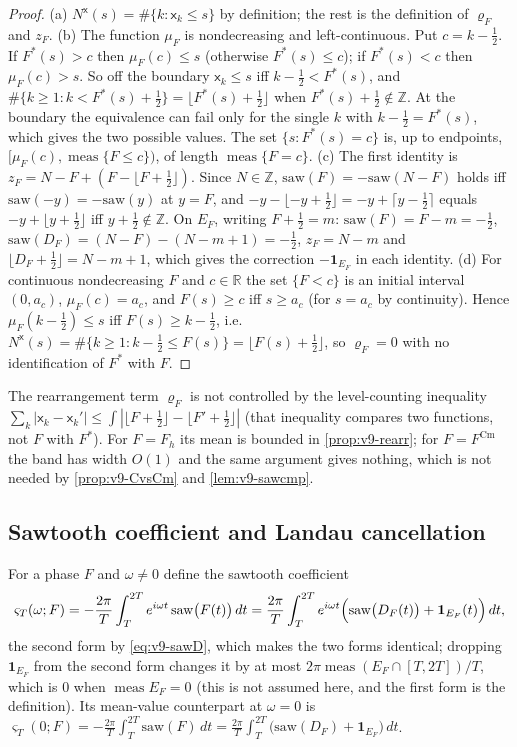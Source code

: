 \documentclass[11pt,a4paper]{article}
\numberwithin{equation}{section}
\theoremstyle{definition}
\theoremstyle{remark}
\newcommand{\meas}{\operatorname{meas}}
\newcommand{\ind}{\mathbf 1}
\newcommand{\Cm}{\mathrm{Cm}}
\begin{document}
\begin{proof}
(a) $N^{\mathsf x}(s)=\#\{k:\mathsf x_k\le s\}$ by definition; the rest is the definition of $\varrho_F$ and $z_F$. (b) The function $\mu_F$ is nondecreasing and left-continuous. Put $c=k-\frac12$. If $F^*(s)>c$ then $\mu_F(c)\le s$ (otherwise $F^*(s)\le c$); if $F^*(s)<c$ then $\mu_F(c)>s$. So off the boundary $\mathsf x_k\le s$ iff $k-\frac12<F^*(s)$, and $\#\{k\ge1:k<F^*(s)+\frac12\}=\lfloor F^*(s)+\frac12\rfloor$ when $F^*(s)+\frac12\notin\mathbb Z$. At the boundary the equivalence can fail only for the single $k$ with $k-\frac12=F^*(s)$, which gives the two possible values. The set $\{s:F^*(s)=c\}$ is, up to endpoints, $[\mu_F(c),\meas\{F\le c\})$, of length $\meas\{F=c\}$. (c) The first identity is $z_F=N-F+(F-\lfloor F+\frac12\rfloor)$. Since $N\in\mathbb Z$, $\mathrm{saw}(F)=-\mathrm{saw}(N-F)$ holds iff $\mathrm{saw}(-y)=-\mathrm{saw}(y)$ at $y=F$, and $-y-\lfloor-y+\frac12\rfloor=-y+\lceil y-\frac12\rceil$ equals $-y+\lfloor y+\frac12\rfloor$ iff $y+\frac12\notin\mathbb Z$. On $E_F$, writing $F+\frac12=m$: $\mathrm{saw}(F)=F-m=-\frac12$, $\mathrm{saw}(D_F)=(N-F)-(N-m+1)=-\frac12$, $z_F=N-m$ and $\lfloor D_F+\frac12\rfloor=N-m+1$, which gives the correction $-\ind_{E_F}$ in each identity. (d) For continuous nondecreasing $F$ and $c\in\mathbb R$ the set $\{F<c\}$ is an initial interval $(0,a_c)$, $\mu_F(c)=a_c$, and $F(s)\ge c$ iff $s\ge a_c$ (for $s=a_c$ by continuity). Hence $\mu_F(k-\frac12)\le s$ iff $F(s)\ge k-\frac12$, i.e.\ $N^{\mathsf x}(s)=\#\{k\ge1:k-\frac12\le F(s)\}=\lfloor F(s)+\frac12\rfloor$, so $\varrho_F=0$ with no identification of $F^*$ with $F$.
\end{proof}
The rearrangement term $\varrho_F$ is not controlled by the level-counting inequality $\sum_k|\mathsf x_k-\mathsf x_k'|\le\int|\lfloor F+\frac12\rfloor-\lfloor F'+\frac12\rfloor|$ (that inequality compares two functions, not $F$ with $F^*$). For $F=F_h$ its mean is bounded in \cref{prop:v9-rearr}; for $F=F^{\Cm}$ the band has width $O(1)$ and the same argument gives nothing, which is not needed by \cref{prop:v9-CvsCm} and \cref{lem:v9-sawcmp}.

\subsection{Sawtooth coefficient and Landau cancellation}\label{sec:v9-sawtooth}
For a phase $F$ and $\omega\neq0$ define the sawtooth coefficient
\begin{equation}\label{eq:v9-varsigma}
\varsigma_T(\omega;F)=-\frac{2\pi}{T}\int_T^{2T}e^{i\omega t}\,\mathrm{saw}\bigl(F(t)\bigr)\,dt
=\frac{2\pi}{T}\int_T^{2T}e^{i\omega t}\Bigl(\mathrm{saw}\bigl(D_F(t)\bigr)+\ind_{E_F}(t)\Bigr)\,dt,
\end{equation}
the second form by \eqref{eq:v9-sawD}, which makes the two forms identical; dropping $\ind_{E_F}$ from the second form changes it by at most $2\pi\meas(E_F\cap[T,2T])/T$, which is $0$ when $\meas E_F=0$ (this is not assumed here, and the first form is the definition). Its mean-value counterpart at $\omega=0$ is $\varsigma_T(0;F)=-\frac{2\pi}{T}\int_T^{2T}\mathrm{saw}(F)\,dt=\frac{2\pi}{T}\int_T^{2T}\bigl(\mathrm{saw}(D_F)+\ind_{E_F}\bigr)\,dt$.
\end{document}
